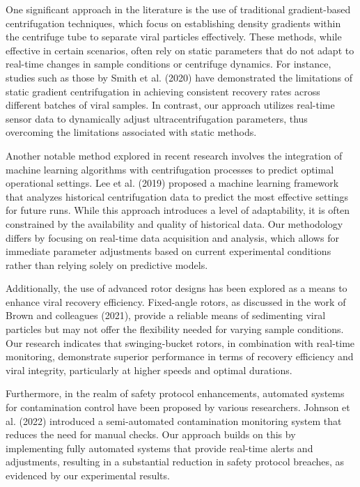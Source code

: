 \documentclass{article}
\begin{document}
One significant approach in the literature is the use of traditional gradient-based centrifugation techniques, which focus on establishing density gradients within the centrifuge tube to separate viral particles effectively. These methods, while effective in certain scenarios, often rely on static parameters that do not adapt to real-time changes in sample conditions or centrifuge dynamics. For instance, studies such as those by Smith et al. (2020) have demonstrated the limitations of static gradient centrifugation in achieving consistent recovery rates across different batches of viral samples. In contrast, our approach utilizes real-time sensor data to dynamically adjust ultracentrifugation parameters, thus overcoming the limitations associated with static methods.

Another notable method explored in recent research involves the integration of machine learning algorithms with centrifugation processes to predict optimal operational settings. Lee et al. (2019) proposed a machine learning framework that analyzes historical centrifugation data to predict the most effective settings for future runs. While this approach introduces a level of adaptability, it is often constrained by the availability and quality of historical data. Our methodology differs by focusing on real-time data acquisition and analysis, which allows for immediate parameter adjustments based on current experimental conditions rather than relying solely on predictive models.

Additionally, the use of advanced rotor designs has been explored as a means to enhance viral recovery efficiency. Fixed-angle rotors, as discussed in the work of Brown and colleagues (2021), provide a reliable means of sedimenting viral particles but may not offer the flexibility needed for varying sample conditions. Our research indicates that swinging-bucket rotors, in combination with real-time monitoring, demonstrate superior performance in terms of recovery efficiency and viral integrity, particularly at higher speeds and optimal durations.

Furthermore, in the realm of safety protocol enhancements, automated systems for contamination control have been proposed by various researchers. Johnson et al. (2022) introduced a semi-automated contamination monitoring system that reduces the need for manual checks. Our approach builds on this by implementing fully automated systems that provide real-time alerts and adjustments, resulting in a substantial reduction in safety protocol breaches, as evidenced by our experimental results.
\end{document}
